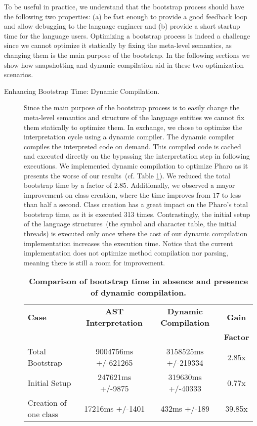 To be useful in practice, we understand that the bootstrap process should have the following two properties: (a) be fast enough to provide a good feedback loop and allow debugging to the language engineer and (b) provide a short startup time for the language users. Optimizing a bootstrap process is indeed a challenge since we cannot optimize it statically by fixing the meta-level semantics, as changing them is the main purpose of the bootstrap. In the following sections we show how snapshotting and dynamic compilation aid in these two optimization scenarios. 

\begin{description}
\item[Enhancing Bootstrap Time: Dynamic Compilation.]
Since the main purpose of the bootstrap process is to easily change the meta-level semantics and structure of the language entities we cannot fix them statically to optimize them. In exchange, we chose to optimize the interpretation cycle using a dynamic compiler. The dynamic compiler compiles the interpreted code on demand. This compiled code is cached and executed directly on the \VM bypassing the interpretation step in following executions. We implemented dynamic compilation to optimize Pharo as it presents the worse of our results~(cf. Table \ref{tb:dynamic_compilation}). We reduced the total bootstrap time by a factor of 2.85. Additionally, we observed a mayor improvement on class creation, where the time improves from 17 to less than half a second. Class creation has a great impact on the Pharo's total bootstrap time, as it is executed 313 times. Contrastingly, the initial setup of the language structures~(\eg the symbol and character table, the initial threads) is executed only once where the cost of our dynamic compilation implementation increases the execution time. Notice that the current implementation does not optimize method compilation nor parsing, meaning there is still a room for improvement.

 \begin{table}[ht]
 \small
 	\centering
 	\begin{tabular}{|l|c|c|c|}
			\hline
			\textbf{Case}
 			& \textbf{AST Interpretation}
			& \textbf{Dynamic Compilation}
			& \textbf{Gain}\\
			&&& \textbf{Factor}\\
		\hline
		Total Bootstrap & 9004756ms +/-621265 & 3158525ms +/-219334 & 2.85x\\\hline
 		Initial Setup& 247621ms +/-9875 & 319630ms +/-40333 & 0.77x\\\hline
		Creation of one class & 17216ms +/-1401 & 432ms +/-189 & 39.85x\\\hline
 	\end{tabular}
	\vspace*{0.2cm}
 	\caption{\small\textbf{Comparison of bootstrap time in absence and presence of dynamic compilation.}\label{tb:dynamic_compilation}}
 \end{table}


\end{description}

